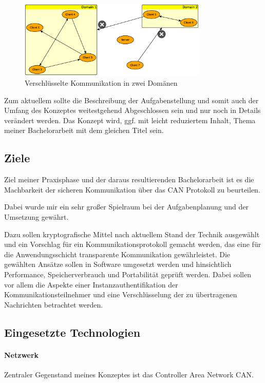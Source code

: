 \begin{figure}
\centering
\includegraphics[width=0.8\textwidth]{Abb/Sichere_Kommunikation}
\caption[sichere Kommunikation]{Verschlüsselte Kommunikation in zwei Domänen}
\label{fig:SichereKommunikation}
\end{figure}

Zum aktuellem sollte die Beschreibung der Aufgabenstellung und somit auch der Umfang des Konzeptes weitestgehend Abgeschlossen sein und nur noch in Details verändert werden. Das Konzept wird, ggf. mit leicht reduziertem Inhalt, Thema meiner Bachelorarbeit mit dem gleichen Titel sein.


\subsection{Ziele}
Ziel meiner Praxisphase und der daraus resultierenden Bachelorarbeit ist es die Machbarkeit der sicheren Kommunikation über das CAN Protokoll zu beurteilen.

Dabei wurde mir ein sehr großer Spielraum bei der Aufgabenplanung und der Umsetzung gewährt. 

 Dazu sollen kryptografische Mittel nach aktuellem Stand der Technik ausgewählt und ein Vorschlag für ein Kommunikationsprotokoll gemacht werden, das eine für die Anwendungsschicht transparente Kommunikation gewährleistet. Die gewählten Ansätze sollen in Software umgesetzt werden und hinsichtlich Performance, Speicherverbrauch und Portabilität geprüft werden. Dabei sollen vor allem die Aspekte einer Instanzauthentifikation der Kommunikationsteilnehmer und eine Verschlüsselung der zu übertragenen Nachrichten betrachtet werden. 

\subsection{Eingesetzte Technologien}
\paragraph{Netzwerk}
Zentraler Gegenstand meines Konzeptes ist das Controller Area Network CAN. 

